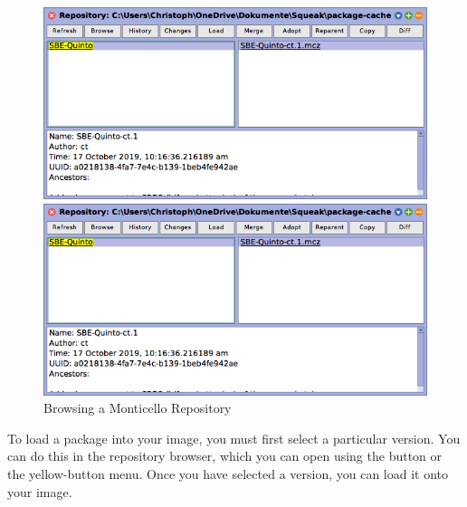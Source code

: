 \documentclass[a4paper,10pt,twoside]{book}
\begin{document}
\begin{figure}[hbt]
\ifluluelse
	{\centerline {\includegraphics[width=\textwidth]{BrowseRepository}}}
	{\centerline {\includegraphics[scale=0.7]{BrowseRepository}}}
\caption{Browsing a Monticello Repository
\label{fig:monticello3}}
\end{figure}


To load a package into your image, you must first select a particular version.
You can do this in the repository browser, which you can open using the  button or the yellow-button menu.
Once you have selected a version, you can load it onto your image.

\end{document}
